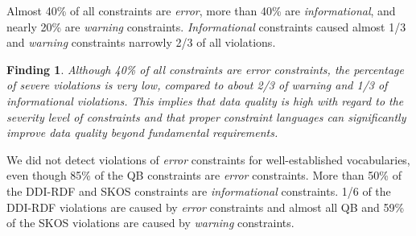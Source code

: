 \documentclass[conference]{IEEEtran}
\newtheorem{hyp}{Finding}
\begin{document}

Almost 40\% of all constraints are \emph{error}, more than 40\% are \emph{informational}, and nearly 20\% are \emph{warning} constraints.
\emph{Informational} constraints caused almost 1/3 and
\emph{warning} constraints narrowly 2/3 of all violations.

\begin{hyp}
Although 40\% of all constraints are error constraints, the percentage of severe violations is very low, compared to about 2/3 of warning and 1/3 of informational violations. This implies that data quality is high with regard to the severity level of constraints and that proper constraint languages can significantly improve data quality beyond fundamental requirements.
\end{hyp} 

We did not detect violations of \emph{error} constraints for well-established vocabularies, even though 85\% of the QB constraints are \emph{error} constraints. 
More than 50\% of the DDI-RDF and SKOS constraints are \emph{informational} constraints.
1/6 of the DDI-RDF violations are caused by \emph{error} constraints and
almost all QB and 59\% of the SKOS violations are caused by \emph{warning} constraints. 
\end{document}

